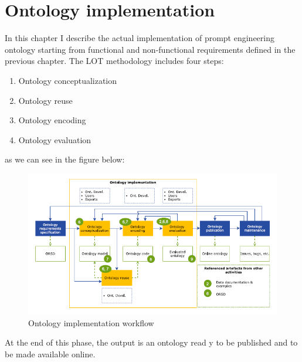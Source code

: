 \chapter{Ontology implementation}
In this chapter I describe the actual implementation of prompt engineering ontology starting from functional and non-functional requirements defined in the previous chapter. The LOT methodology includes four steps: 
\begin{enumerate}
    \item Ontology conceptualization

    \item Ontology reuse

    \item Ontology encoding

    \item Ontology evaluation
\end{enumerate}
as we can see in the figure below:
\begin{figure}[H]
    \centering
    \includegraphics[width=0.9\linewidth]{Figures/fig_14.png}
    \caption{Ontology implementation workflow}
    \label{fig:enter-label}
\end{figure}
At the end of this phase, the output is an ontology read y to be published and to be made available online.

\newpage
